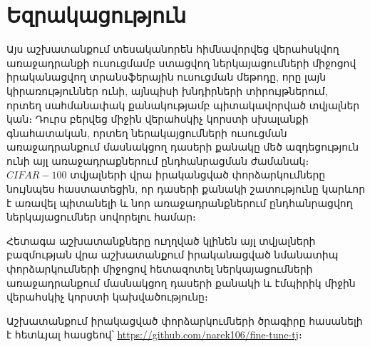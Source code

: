 \documentclass[12pt]{article}
\begin{document}
\pagebreak

\section*{\hfill Եզրակացություն \hfill} \noindent
{}
{}


\par Այս աշխատանքում տեսականորեն հիմնավորվեց վերահսկվող առաջադրանքի ուսուցմամբ ստացվող ներկայացումների միջոցով իրականացվող տրանսֆերային ուսուցման մեթոդը, որը լայն կիրառություններ ունի, այնպիսի խնդիրների տիրույթներում, որտեղ սահմանափակ քանակությամբ պիտակավորված տվյալներ կան։ Դուրս բերվեց միջին վերահսկիչ կորստի սխալանքի գնահատական, որտեղ ներակայցումների ուսուցման առաջադրանքում մասնակցող դասերի քանակը մեծ ազդեցություն ունի այլ առաջադրաքներում ընդհանրացման ժամանակ։ $CIFAR-100$ տվյալների վրա իրականցված փորձարկումները նույնպես հաստատեցին, որ դասերի քանակի շատությունը կարևոր է  առավել պիտանելի և նոր առաջադրանքներում ընդհանրացվող ներկայացումներ սովորելու համար։
\par Հետագա աշխատանքները ուղղված կլինեն այլ տվյալների բազմության վրա աշխատանքում իրականացված նմանատիպ փորձարկումների միջոցով հետազոտել ներկայացումների առաջադրանքում մասնակցող դասերի քանակի և էմպիրիկ միջին վերահսկիչ կորստի կախվածությունը։

Աշխատանքում իրակացված փորձարկումների ծրագիրը հասանելի է հետևյալ հասցեով՝ \url{https://github.com/narek106/fine-tune-tj}։
  
\end{document}

